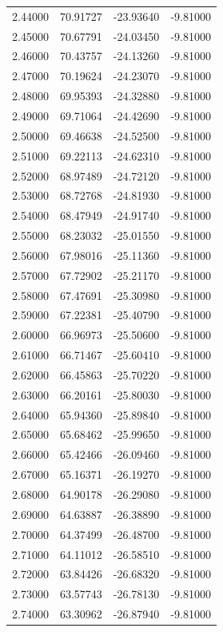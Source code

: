 \begin{table}
\begin{tabular}{llll}
2.44000 & 70.91727 & -23.93640 & -9.81000 \\
2.45000 & 70.67791 & -24.03450 & -9.81000 \\
2.46000 & 70.43757 & -24.13260 & -9.81000 \\
2.47000 & 70.19624 & -24.23070 & -9.81000 \\
2.48000 & 69.95393 & -24.32880 & -9.81000 \\
2.49000 & 69.71064 & -24.42690 & -9.81000 \\
2.50000 & 69.46638 & -24.52500 & -9.81000 \\
2.51000 & 69.22113 & -24.62310 & -9.81000 \\
2.52000 & 68.97489 & -24.72120 & -9.81000 \\
2.53000 & 68.72768 & -24.81930 & -9.81000 \\
2.54000 & 68.47949 & -24.91740 & -9.81000 \\
2.55000 & 68.23032 & -25.01550 & -9.81000 \\
2.56000 & 67.98016 & -25.11360 & -9.81000 \\
2.57000 & 67.72902 & -25.21170 & -9.81000 \\
2.58000 & 67.47691 & -25.30980 & -9.81000 \\
2.59000 & 67.22381 & -25.40790 & -9.81000 \\
2.60000 & 66.96973 & -25.50600 & -9.81000 \\
2.61000 & 66.71467 & -25.60410 & -9.81000 \\
2.62000 & 66.45863 & -25.70220 & -9.81000 \\
2.63000 & 66.20161 & -25.80030 & -9.81000 \\
2.64000 & 65.94360 & -25.89840 & -9.81000 \\
2.65000 & 65.68462 & -25.99650 & -9.81000 \\
2.66000 & 65.42466 & -26.09460 & -9.81000 \\
2.67000 & 65.16371 & -26.19270 & -9.81000 \\
2.68000 & 64.90178 & -26.29080 & -9.81000 \\
2.69000 & 64.63887 & -26.38890 & -9.81000 \\
2.70000 & 64.37499 & -26.48700 & -9.81000 \\
2.71000 & 64.11012 & -26.58510 & -9.81000 \\
2.72000 & 63.84426 & -26.68320 & -9.81000 \\
2.73000 & 63.57743 & -26.78130 & -9.81000 \\
2.74000 & 63.30962 & -26.87940 & -9.81000 \\

\end{tabular}
\end{table}
